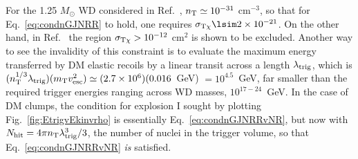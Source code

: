 \documentclass[
    twocolumn,
	prd,
        amssymb,
	preprintnumbers,
	secnumarabic,
	nofootinbib,
	superscriptaddress]{revtex4-1}
\begin{document}
For the 1.25 $M_\odot$ WD considered in Ref.~\cite{Graham:2018efk}, $n_{\rm T} \simeq 10^{-31}$ cm$^{-3}$, so that for Eq.~\eqref{eq:condnGJNRR} to hold, one requires $\sigma_{\rm T\chi} \lsim 2 \times 10^{-21}$.
On the other hand, in Ref.~\cite{Graham:2018efk} the region $\sigma_{\rm T\chi} > 10^{-12}$ cm$^2$ is shown to be excluded.
Another way to see the invalidity of this constraint is to evaluate the maximum energy transferred by DM elastic recoils by a linear transit across a length $\lambda_{\rm trig}$, which is $(n^{1/3}_{\rm T} \lambda_{\rm trig})(m_{\rm T} v^2_{\rm esc}) \simeq (2.7\times10^6) (0.016$~GeV) $= 10^{4.5}$~GeV, far smaller than the required trigger energies ranging across WD masses, $10^{17-24}$~GeV.
In the case of DM clumps, the condition for explosion I sought by plotting Fig.~\ref{fig:EtrigvEkinvrho} is essentially Eq.~\eqref{eq:condnGJNRRvNR}, but now with $N_{\rm hit} = 4\pi n_{\rm T} \lambda^3_{\rm trig}/3$, the number of nuclei in the trigger volume, so that Eq.~\eqref{eq:condnGJNRRvNR} {\em is} satisfied. 
\end{document}
